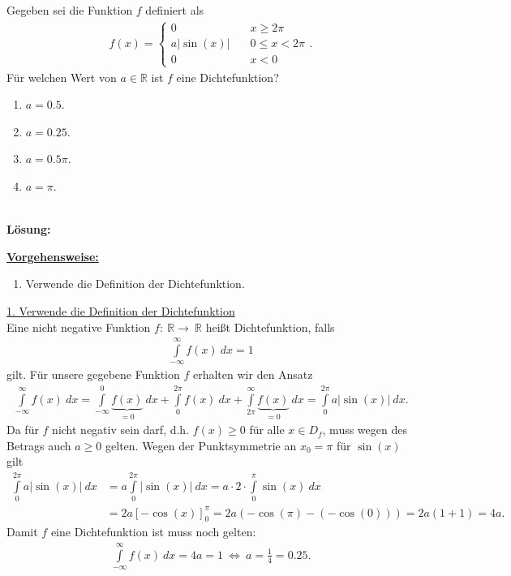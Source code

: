 \subsection*{}
Gegeben sei die Funktion $f $ definiert als 
\begin{align*}
	f(x)
	=
	\begin{cases}
		0 \quad & x \geq 2 \pi\\
		a | \sin(x)  | \quad &0 \leq x < 2 \pi\\
		0 \quad &x<0
	\end{cases}.
\end{align*}
Für welchen Wert von $a \in \mathbb{R}$ ist $f$ eine Dichtefunktion?
\renewcommand{\labelenumi}{(\alph{enumi})}
\begin{enumerate}
	\item 
	$a = 0.5$.
	\item
	$a =0.25$.
	\item
	$a = 0.5 \pi $.
	\item
	$a = \pi$.
\end{enumerate}
\ \\
\textbf{Lösung:}
\begin{mdframed}
\underline{\textbf{Vorgehensweise:}}
\renewcommand{\labelenumi}{\theenumi.}
\begin{enumerate}
\item Verwende die Definition der Dichtefunktion.
\end{enumerate}
\end{mdframed}

\underline{1. Verwende die Definition der Dichtefunktion}\\
Eine nicht negative Funktion $f : \ \mathbb{R} \to \ \mathbb{R}$ heißt Dichtefunktion, falls
\begin{align*}
	\int \limits_{- \infty}^\infty f(x) \ dx = 1
\end{align*}
gilt. Für unsere gegebene Funktion $f$ erhalten wir den Ansatz 
\begin{align*}
	\int \limits_{- \infty}^\infty f(x) \ dx
	=
	\int \limits_{- \infty}^{0} \underbrace{f(x)}_{= 0} \ dx
	+
	\int \limits_{0}^{2 \pi} f(x) \ dx
	+
	\int \limits_{2 \pi}^\infty \underbrace{f(x)}_{= 0} \ dx
	=
	\int \limits_{0}^{2 \pi} a | \sin(x) | \ dx.
\end{align*}
Da für $f$ nicht negativ sein darf, d.h. $f(x) \geq 0$ für alle $x \in D_f$, muss wegen des Betrags auch $a \geq 0 $ gelten.
Wegen der Punktsymmetrie an $x_0  = \pi$ für $\sin(x)$ gilt
\begin{align*}
	\int \limits_{0}^{2 \pi} a | \sin(x) | \ dx
	&=
	a \int \limits_{0}^{2 \pi}  | \sin(x) | \ dx
	=
	a \cdot 2 \cdot  \int \limits_{0}^\pi \sin(x) \ dx\\
	&=
	2a \left[- \cos (x)\right]_{0}^\pi
	= 
	2a ( -\cos(\pi) - (- \cos(0)) )
	=
	2a ( 1 + 1 ) = 4a. 
\end{align*} 
Damit $f$ eine Dichtefunktion ist muss noch gelten: 
\begin{align*}
	\int \limits_{- \infty}^\infty f(x) \ dx  = 4a = 1  
	\ \Leftrightarrow \
	a = \frac{1}{4} = 0.25.
\end{align*}

